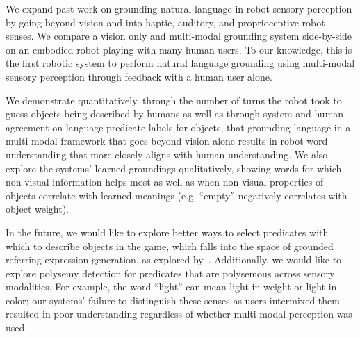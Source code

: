 We expand past work on grounding natural language in robot sensory perception by going beyond vision and into haptic, auditory, and proprioceptive robot senses.
We compare a vision only and multi-modal grounding system side-by-side on an embodied robot playing \ispy with many human users.
To our knowledge, this is the first robotic system to perform natural language grounding using multi-modal sensory perception through feedback with a human user alone.

We demonstrate quantitatively, through the number of turns the robot took to guess objects being described by humans as well as through system and human agreement on language predicate labels for objects, that grounding language in a multi-modal framework that goes beyond vision alone results in robot word understanding that more closely aligns with human understanding.
We also explore the systems' learned groundings qualitatively, showing words for which non-visual information helps most as well as when non-visual properties of objects correlate with learned meanings (e.g. ``empty'' negatively correlates with object weight).

In the future, we would like to explore better ways to select predicates with which to describe objects in the \ispy game, which falls into the space of grounded referring expression generation, as explored by~\cite{tellex:rss14}.
Additionally, we would like to explore polysemy detection for predicates that are polysemous across sensory modalities.
For example, the word ``light'' can mean light in weight or light in color; our systems' failure to distinguish these senses as users intermixed them resulted in poor understanding regardless of whether multi-modal perception was used.